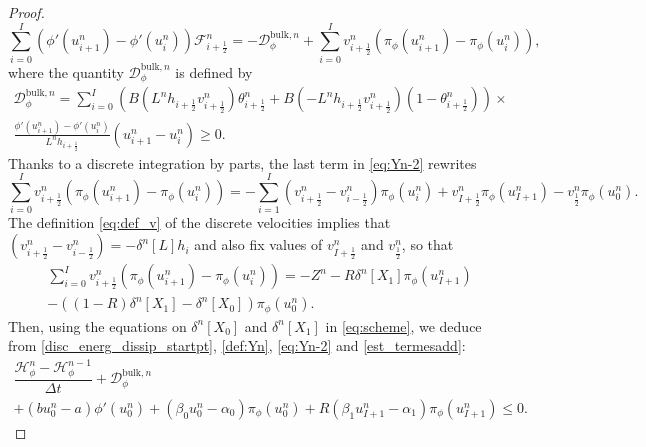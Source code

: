 \documentclass{amsart}
\newcommand\dt{\Delta t}
\newcommand\Fluxnum[1]{\mathcal{F}_{#1 \frac{1}{2}}^n}
\newcommand\h[1]{h_{#1 \frac{1}{2}}}
\renewcommand\v[2]{v_{#1 \frac{1}{2}}^{#2}}
\newcommand\Bern[3]{B\left(#3 L^n \h{#1}{} \v{#1}{#2}\right)}
\renewcommand\H{\mathcal{H}_{\phi}}
\begin{document}
\begin{proof}
		\begin{equation} \label{eq:Yn-2}
			\sum_{i=0}^I\left( \phi'(u_{i+1}^n) - \phi'(u_{i}^n) \right) \Fluxnum{i+} =
			- \mathcal{D}_{\phi}^{\text{bulk},n} + \sum_{i=0}^I v_{i + \frac{1}{2}}^n (\pi_\phi(u_{i+1}^n) - \pi_\phi(u_{i}^n)),
		\end{equation}
		where  the quantity $\mathcal{D}_{\phi}^{\text{bulk},n}$ is defined by
		\begin{multline}\label{eq:dbulk.sum}
		\mathcal{D}_{\phi}^{\text{bulk},n} = \sum_{i=0}^{I}
		\left(\Bern{i+}{n}{} \theta_{i+\frac{1}{2}}^n + \Bern{i+}{n}{-}(1 - \theta_{i+\frac{1}{2}}^n) \right)\times  \\
			\frac{\phi'(u_{i+1}^n) - \phi'(u_{i}^n) }{L^n \h{i+}} (u_{i+1}^n - u_{i}^n)  \geq 0.
	\end{multline}
	Thanks to a discrete integration by parts, the last term in \eqref{eq:Yn-2} rewrites 
	$$
	\sum_{i=0}^I v_{i + \frac{1}{2}}^n (\pi_\phi(u_{i+1}^n) - \pi_\phi(u_{i}^n))=-\sum_{i=1}^I (v_{i + \frac{1}{2}}^n-v_{i - \frac{1}{2}}^n)\pi_\phi (u_{i}^n) + v_{I+\frac12}^n \pi_\phi(u_{I+1}^n) -v_{\frac{1}{2}}^n\pi_\phi(u_0^n).
	$$
	The definition \eqref{eq:def_v} of the discrete velocities implies that \((v_{i + \frac{1}{2}}^n-v_{i - \frac{1}{2}}^n)=-\delta^n[L]h_i\) and also fix values of  $v_{I+\frac{1}{2}}^n$ and $v_{\frac{1}{2}}^n$,
	so that 
	\begin{multline}\label{est_termesadd}
	\sum_{i=0}^I v_{i + \frac{1}{2}}^n (\pi_\phi(u_{i+1}^n) - \pi_\phi(u_{i}^n))=-Z^n-R\delta^n[X_1]\pi_\phi (u_{I+1}^n)\\
	-((1-R)\delta^n[X_1]-\delta^n[X_0])\pi_\phi(u_0^n).
	\end{multline}
		Then, using the equations on $\delta^n[X_0]$ and $\delta^n[X_1]$ in \eqref{eq:scheme}, we deduce from \eqref{disc_energ_dissip_startpt}, \eqref{def:Yn}, \eqref{eq:Yn-2} and \eqref{est_termesadd}:
		\begin{multline*}
			\dfrac{\H^n - \H^{n-1}}{\dt} + \mathcal{D}_{\phi}^{\text{bulk},n} \\
			+ (bu_0^n - a)\phi'(u_0^n)+ (\beta_0 u_0^n-\alpha_0 )\pi_\phi(u_0^n) 
			 + R( \beta_1 u_{I+1}^n-\alpha_1)\pi_\phi(u_{I+1}^n) \leq 0.
		\end{multline*}
		

\end{proof}
\end{document}
